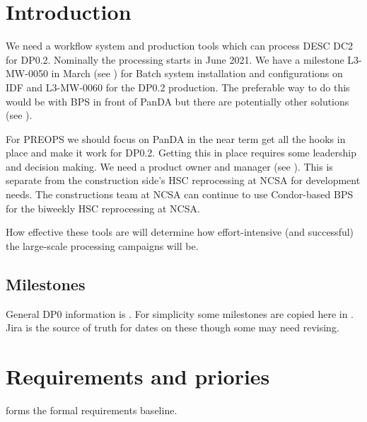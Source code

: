 \section{Introduction}

We need a workflow system and production tools which can process DESC DC2 for DP0.2. Nominally the processing starts in June 2021.
We have a milestone L3-MW-0050 in March (see ) for Batch system installation and configurations on IDF and L3-MW-0060 for the DP0.2 production.
The preferable way to do this would be with BPS in front of PanDA but there are potentially other solutions (see ).

For PREOPS we should focus on PanDA in the near term get all the hooks in place and make it work for DP0.2.
Getting this in place requires some leadership and decision making. We need a product owner and manager  (see ).
This is separate from the construction side's HSC reprocessing at NCSA for development needs. The  constructions team at NCSA can continue to use Condor-based BPS for the biweekly HSC reprocessing at NCSA.

How effective these tools are will determine how effort-intensive (and successful) the large-scale processing campaigns will be.


\subsection{Milestones}
General DP0 information is  . For simplicity some  milestones
are copied here in . Jira is the source of truth for dates on these though some may need revising.


\section {Requirements and priories} \label{sec:reqs}
 forms the formal requirements baseline.

